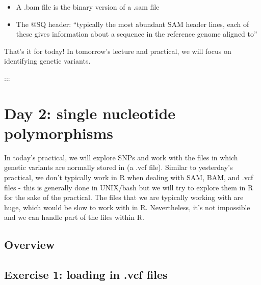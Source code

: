 \documentclass[
  letterpaper,
  DIV=11,
  numbers=noendperiod]{scrreprt}
\providecommand{\tightlist}{%
  \setlength{\itemsep}{0pt}\setlength{\parskip}{0pt}}\usepackage{longtable,booktabs,array}
\begin{document}
\begin{tcolorbox}[enhanced jigsaw, arc=.35mm, left=2mm, titlerule=0mm, rightrule=.15mm, colframe=quarto-callout-tip-color-frame, coltitle=black, colback=white, opacityback=0, bottomtitle=1mm, bottomrule=.15mm, colbacktitle=quarto-callout-tip-color!10!white, breakable, title=\textcolor{quarto-callout-tip-color}{\faLightbulb}\hspace{0.5em}{Tips}, toptitle=1mm, toprule=.15mm, opacitybacktitle=0.6, leftrule=.75mm]

\begin{itemize}
\tightlist
\item
  A .bam file is the binary version of a .sam file
\item
  The @SQ header: ``typically the most abundant SAM header lines, each
  of these gives information about a sequence in the reference genome
  aligned to''
\end{itemize}

\end{tcolorbox}

That's it for today! In tomorrow's lecture and practical, we will focus
on identifying genetic variants.

:::


\chapter{Day 2: single nucleotide
polymorphisms}\label{day-2-single-nucleotide-polymorphisms}

In today's practical, we will explore SNPs and work with the files in
which genetic variants are normally stored in (a .vcf file). Similar to
yesterday's practical, we don't typically work in R when dealing with
SAM, BAM, and .vcf files - this is generally done in UNIX/bash but we
will try to explore them in R for the sake of the practical. The files
that we are typically working with are huge, which would be slow to work
with in R. Nevertheless, it's not impossible and we can handle part of
the files within R.

\section{Overview}\label{overview-2}

\section{Exercise 1: loading in .vcf
files}\label{exercise-1-loading-in-.vcf-files}
\end{document}
